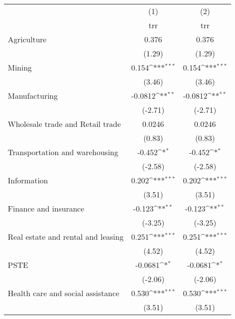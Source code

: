 {
\def\sym#1{\ifmmode^{#1}\else\(^{#1}\)\fi}
\begin{tabular}{l*{2}{c}}
\hline\hline
                    &\multicolumn{1}{c}{(1)}&\multicolumn{1}{c}{(2)}\\
                    &\multicolumn{1}{c}{trr}&\multicolumn{1}{c}{trr}\\
\hline
Agriculture         &       0.376         &       0.376         \\
                    &      (1.29)         &      (1.29)         \\
[1em]
Mining              &       0.154\sym{***}&       0.154\sym{***}\\
                    &      (3.46)         &      (3.46)         \\
[1em]
Manufacturing       &     -0.0812\sym{**} &     -0.0812\sym{**} \\
                    &     (-2.71)         &     (-2.71)         \\
[1em]
Wholesale trade and Retail trade&      0.0246         &      0.0246         \\
                    &      (0.83)         &      (0.83)         \\
[1em]
Transportation and warehousing&      -0.452\sym{*}  &      -0.452\sym{*}  \\
                    &     (-2.58)         &     (-2.58)         \\
[1em]
Information         &       0.202\sym{***}&       0.202\sym{***}\\
                    &      (3.51)         &      (3.51)         \\
[1em]
Finance and insurance&      -0.123\sym{**} &      -0.123\sym{**} \\
                    &     (-3.25)         &     (-3.25)         \\
[1em]
 Real estate and rental and leasing&       0.251\sym{***}&       0.251\sym{***}\\
                    &      (4.52)         &      (4.52)         \\
[1em]
PSTE                &     -0.0681\sym{*}  &     -0.0681\sym{*}  \\
                    &     (-2.06)         &     (-2.06)         \\
[1em]
Health care and social assistance&       0.530\sym{***}&       0.530\sym{***}\\
                    &      (3.51)         &      (3.51)         \\
[1em]

\end{tabular}}
